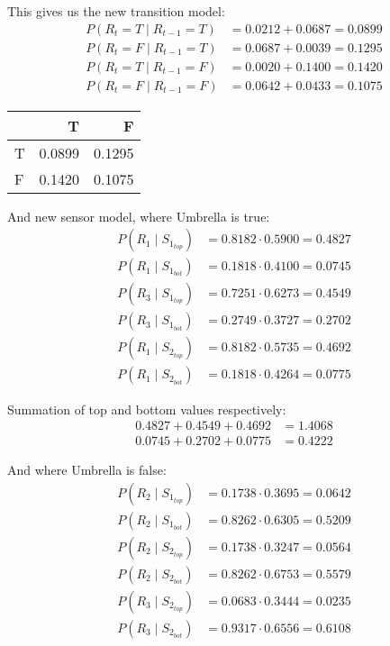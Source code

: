 \documentclass[colorlinks=true,linkcolor=blue]{article}
\begin{document}
This gives us the new transition model:
\begin{align*}
P(R_t = T \mid R_{t-1} = T) &= 0.0212 + 0.0687 = 0.0899\\
P(R_t = F \mid R_{t-1} = T) &= 0.0687 + 0.0039 = 0.1295\\
P(R_t = T \mid R_{t-1} = F) &= 0.0020 + 0.1400 = 0.1420\\
P(R_t = F \mid R_{t-1} = F) &= 0.0642 + 0.0433 = 0.1075
\end{align*}
\begin{center}
\begin{tabular}{l|rr}
 & T & F\\
\hline
T & 0.0899 & 0.1295\\
F & 0.1420 & 0.1075\\
\end{tabular}
\end{center}

And new sensor model, where Umbrella is true:
\begin{align*}
P(R_1 \mid S_{1_{top}}) &= 0.8182 \cdot 0.5900 = 0.4827\\
P(R_1 \mid S_{1_{bot}}) &= 0.1818 \cdot 0.4100 = 0.0745\\
P(R_3 \mid S_{1_{top}}) &= 0.7251 \cdot 0.6273 = 0.4549\\
P(R_3 \mid S_{1_{bot}}) &= 0.2749 \cdot 0.3727 = 0.2702\\
P(R_1 \mid S_{2_{top}}) &= 0.8182 \cdot 0.5735 = 0.4692\\
P(R_1 \mid S_{2_{bot}}) &= 0.1818 \cdot 0.4264 = 0.0775
\end{align*}

Summation of top and bottom values respectively:
\begin{align*}
0.4827 + 0.4549 + 0.4692 &= 1.4068\\
0.0745 + 0.2702 + 0.0775 &= 0.4222
\end{align*}

And where Umbrella is false:
\begin{align*}
P(R_2 \mid S_{1_{top}}) &= 0.1738 \cdot 0.3695 = 0.0642\\
P(R_2 \mid S_{1_{bot}}) &= 0.8262 \cdot 0.6305 = 0.5209\\
P(R_2 \mid S_{2_{top}}) &= 0.1738 \cdot 0.3247 = 0.0564\\
P(R_2 \mid S_{2_{bot}}) &= 0.8262 \cdot 0.6753 = 0.5579\\
P(R_3 \mid S_{2_{top}}) &= 0.0683 \cdot 0.3444 = 0.0235\\
P(R_3 \mid S_{2_{bot}}) &= 0.9317 \cdot 0.6556 = 0.6108
\end{align*}
\end{document}
